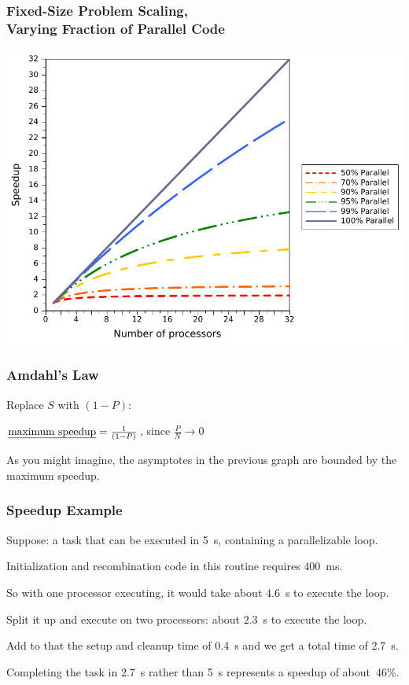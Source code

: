 \begin{frame}
  \frametitle{Fixed-Size Problem Scaling, \\ Varying Fraction of Parallel Code}

  \begin{center}
    \hspace*{2em}\includegraphics[scale=0.68]{images/parallel-scaling.pdf}
  \end{center}
\end{frame}


\begin{frame}
  \frametitle{Amdahl's Law}

 \hspace*{2em}Replace $S$ with $(1 - P)$:

  \begin{center}
  \end{center}
  \vfill
  \begin{center}
    $\mbox{\em maximum speedup} = \frac{1}{(1 - P)}$, since $\frac{P}{N} \rightarrow 0$
  \end{center}

As you might imagine, the asymptotes in the previous graph are bounded by the
  maximum speedup.
\end{frame}

\begin{frame}
\frametitle{Speedup Example}


Suppose: a task that can be executed in 5~s, containing a parallelizable loop.

Initialization and recombination code in this routine requires 400~ms. 

So with one processor executing, it would take about 4.6~s to execute the loop. 

Split it up and execute on two processors: about 2.3~s to execute the loop. 

Add to that the setup and cleanup time of 0.4~s and we get a total time of 2.7~s. 

Completing the task in 2.7~s rather than 5~s represents a speedup of about~46\%.

\end{frame}


